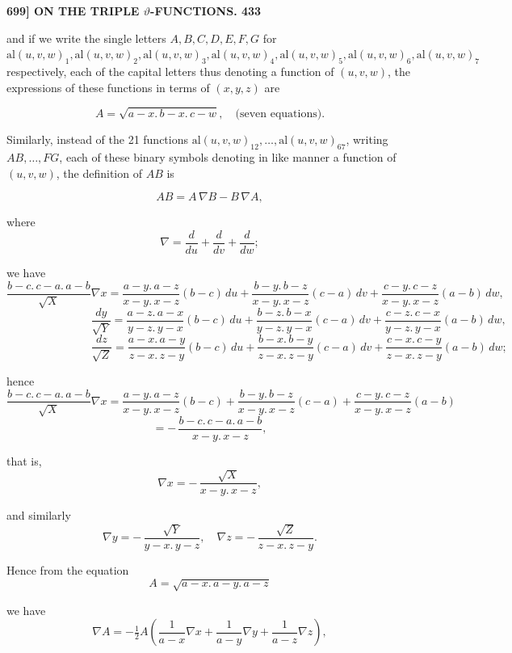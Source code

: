 \documentclass[11pt]{article}
\begin{document}
\bigskip
\noindent\textbf{699] \quad ON THE TRIPLE $\vartheta$-FUNCTIONS. \hfill 433}

\medskip

and if we write the single letters $A, B, C, D, E, F, G$ for $\mathrm{al}(u, v, w)_1, \mathrm{al}(u, v, w)_2, \mathrm{al}(u, v, w)_3, \mathrm{al}(u, v, w)_4, \mathrm{al}(u, v, w)_5, \mathrm{al}(u, v, w)_6, \mathrm{al}(u, v, w)_7$ respectively, each of the capital letters thus denoting a function of $(u, v, w)$, the expressions of these functions in terms of $(x, y, z)$ are

\[
A = \sqrt{a-x.\,b-x.\,c-w}, \quad \text{(seven equations).}
\]

Similarly, instead of the 21 functions $\mathrm{al}(u, v, w)_{12}, \ldots, \mathrm{al}(u, v, w)_{67}$, writing $AB, \ldots, FG$, each of these binary symbols denoting in like manner a function of $(u, v, w)$, the definition of $AB$ is

\[
AB = A\,\nabla B - B\,\nabla A,
\]

where
\[
\nabla = \frac{d}{du} + \frac{d}{dv} + \frac{d}{dw};
\]

we have
\[
\frac{b-c.\,c-a.\,a-b}{\sqrt{X}}\nabla x = \frac{a-y.\,a-z}{x-y.\,x-z}(b-c)\,du + \frac{b-y.\,b-z}{x-y.\,x-z}(c-a)\,dv + \frac{c-y.\,c-z}{x-y.\,x-z}(a-b)\,dw,
\]
\[
\phantom{\frac{b-c.\,c-a.\,a-b}{\sqrt{Y}}}\frac{dy}{\sqrt{Y}} = \frac{a-z.\,a-x}{y-z.\,y-x}(b-c)\,du + \frac{b-z.\,b-x}{y-z.\,y-x}(c-a)\,dv + \frac{c-z.\,c-x}{y-z.\,y-x}(a-b)\,dw,
\]
\[
\phantom{\frac{b-c.\,c-a.\,a-b}{\sqrt{Z}}}\frac{dz}{\sqrt{Z}} = \frac{a-x.\,a-y}{z-x.\,z-y}(b-c)\,du + \frac{b-x.\,b-y}{z-x.\,z-y}(c-a)\,dv + \frac{c-x.\,c-y}{z-x.\,z-y}(a-b)\,dw;
\]

hence
\[
\frac{b-c.\,c-a.\,a-b}{\sqrt{X}}\nabla x = \frac{a-y.\,a-z}{x-y.\,x-z}(b-c) + \frac{b-y.\,b-z}{x-y.\,x-z}(c-a) + \frac{c-y.\,c-z}{x-y.\,x-z}(a-b)
\]
\[
= -\,\frac{b-c.\,c-a.\,a-b}{x-y.\,x-z},
\]

that is,
\[
\nabla x = -\,\frac{\sqrt{X}}{x-y.\,x-z},
\]

and similarly
\[
\nabla y = -\,\frac{\sqrt{Y}}{y-x.\,y-z}, \quad \nabla z = -\,\frac{\sqrt{Z}}{z-x.\,z-y}.
\]

Hence from the equation
\[
A = \sqrt{a-x.\,a-y.\,a-z}
\]

we have
\[
\nabla A = -\tfrac{1}{2}A\left(\frac{1}{a-x}\nabla x + \frac{1}{a-y}\nabla y + \frac{1}{a-z}\nabla z\right),
\]
\end{document}

